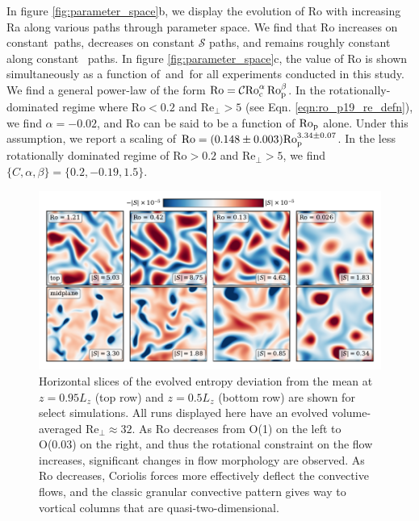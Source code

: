 In figure \ref{fig:parameter_space}b, we display the evolution of Ro
with increasing Ra along various paths through parameter space.
We find that Ro increases on constant \con$\,$paths, decreases on constant $\mathcal{S}$
paths, and remains roughly constant along constant \pro$\,$ paths.
In figure \ref{fig:parameter_space}c, the value of Ro is shown simultaneously as
a function of \pro$\,$and \con$\,$for all experiments conducted in this study.
We find a general power-law of the form \mbox{$\text{Ro} = \mathcal{C} \text{Ro}_{\text{c}}^{\alpha}\,\text{Ro}_{\text{p}}^{\beta}$}.
In the rotationally-dominated regime where $\text{Ro} < 0.2$ and 
$\text{Re}_{\perp} > 5$ (see Eqn. \ref{eqn:ro_p19_re_defn}),
we find $\alpha = -0.02$, and $\text{Ro}$ can be said to be a function
of $\text{Ro}_{\text{p}}$ alone. Under this assumption, we report a scaling of $\text{Ro} = (0.148 \pm 0.003) \text{Ro}_{\text{p}}^{3.34 \pm 0.07}$.
In the less rotationally dominated regime of $\text{Ro} > 0.2$ and $\text{Re}_{\perp} > 5$, 
we find $\{C, \alpha, \beta\} = \{0.2, -0.19, 1.5\}$.




\begin{figure}[ht!]
    \includegraphics[width=\textwidth]{./figs/dynamics_plot.pdf}
    \caption[Depiction of flow morphologies at various values of the Rossby number]
	{ Horizontal slices of the evolved entropy deviation from the mean
	at $z = 0.95L_z$ (top row) and $z = 0.5L_z$ (bottom row) are shown for select simulations. 
	All runs displayed here have an evolved volume-averaged $\text{Re}_\perp \approx 32$. 
    As Ro decreases from O(1) on the left to O(0.03) on the right, and thus the rotational
    constraint on the flow increases, significant changes in flow morphology are observed.
    As Ro decreases, Coriolis forces more effectively
    deflect the convective flows, and the classic granular convective pattern gives way
    to vortical columns that are quasi-two-dimensional.
    \label{fig:dynamics_plot} }
\end{figure}

